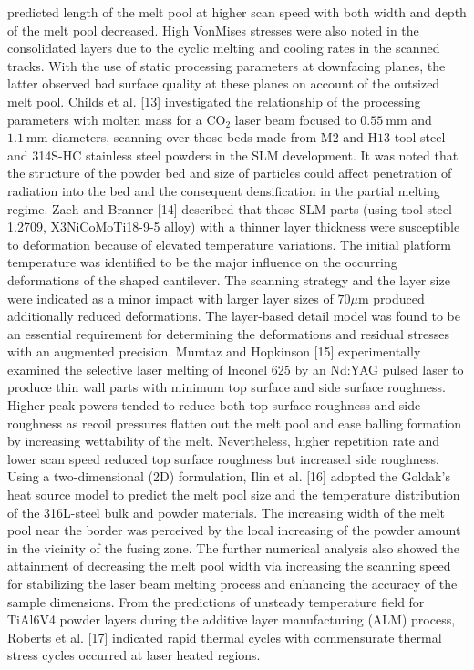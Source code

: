 \documentclass[10pt]{article}
\begin{document}
predicted length of the melt pool at higher scan speed with both width and depth of the melt pool decreased. High VonMises stresses were also noted in the consolidated layers due to the cyclic melting and cooling rates in the scanned tracks. With the use of static processing parameters at downfacing planes, the latter observed bad surface quality at these planes on account of the outsized melt pool. Childs et al. [13] investigated the relationship of the processing parameters with molten mass for a $\mathrm{CO}_{2}$ laser beam focused to $0.55 \mathrm{~mm}$ and $1.1 \mathrm{~mm}$ diameters, scanning over those beds made from M2 and $\mathrm{H} 13$ tool steel and 314S-HC stainless steel powders in the SLM development. It was noted that the structure of the powder bed and size of particles could affect penetration of radiation into the bed and the consequent densification in the partial melting regime. Zaeh and Branner [14] described that those SLM parts (using tool steel 1.2709, X3NiCoMoTi18-9-5 alloy) with a thinner layer thickness were susceptible to deformation because of elevated temperature variations. The initial platform temperature was identified to be the major influence on the occurring deformations of the shaped cantilever. The scanning strategy and the layer size were indicated as a minor impact with larger layer sizes of $70 \mu \mathrm{m}$ produced additionally reduced deformations. The layer-based detail model was found to be an essential requirement for determining the deformations and residual stresses with an augmented precision. Mumtaz and Hopkinson [15] experimentally examined the selective laser melting of Inconel 625 by an Nd:YAG pulsed laser to produce thin wall parts with minimum top surface and side surface roughness. Higher peak powers tended to reduce both top surface roughness and side roughness as recoil pressures flatten out the melt pool and ease balling formation by increasing wettability of the melt. Nevertheless, higher repetition rate and lower scan speed reduced top surface roughness but increased side roughness. Using a two-dimensional (2D) formulation, Ilin et al. [16] adopted the Goldak's heat source model to predict the melt pool size and the temperature distribution of the 316L-steel bulk and powder materials. The increasing width of the melt pool near the border was perceived by the local increasing of the powder amount in the vicinity of the fusing zone. The further numerical analysis also showed the attainment of decreasing the melt pool width via increasing the scanning speed for stabilizing the laser beam melting process and enhancing the accuracy of the sample dimensions. From the predictions of unsteady temperature field for TiAl6V4 powder layers during the additive layer manufacturing (ALM) process, Roberts et al. [17] indicated rapid thermal cycles with commensurate thermal stress cycles occurred at laser heated regions.
\end{document}
